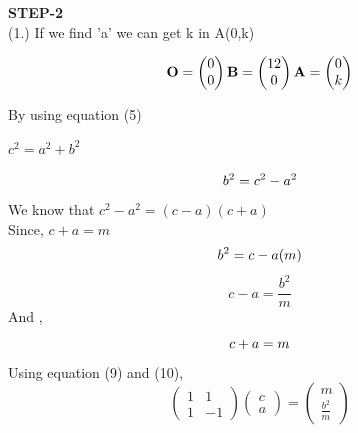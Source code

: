 \documentclass[10pt,a4paper]{report}
\let\vec\mathbf
\begin{document}
\begin{multicols}{2}
\textbf{STEP-2}\vspace{2mm}\\
(1.) If we find 'a' we can get k in A(0,k) \\\vspace{2mm}

\begin{equation}\vec{
    O=\begin{pmatrix}
0\\
0
\end{pmatrix} 
    B=\begin{pmatrix}
12\\
0
\end{pmatrix} 
    A=\begin{pmatrix}
0\\
k
 \end{pmatrix} } \vspace{3mm}
\end{equation}
  
By using equation (5)
\begin{center}
    $ c^2 =a^2 + b^2 $ \vspace{2mm}
\end{center}
\begin{equation}
    b^2 = c^2- a^2 \vspace{2mm}
\end{equation}
We know that $c^2- a^2 =  (c-a) (c+a)$\vspace{2mm}\\
Since, $ c+a=m$
\begin{equation}
  b^2 = c-a (m) \vspace{2mm}
\end{equation}
\begin{equation}
 c-a = \frac{b^2}{m}
\end{equation}
And ,
\begin{equation}
 c+a = m \vspace{2mm}
\end{equation}
Using equation (9) and (10),
\begin{equation}
  \begin{pmatrix}
1 & 1\\
1 &-1
\end{pmatrix} 
\begin{pmatrix}
c\\
a
\end{pmatrix} = \begin{pmatrix}
m\\
\frac{b^2}{m}
\end{pmatrix} 
\end{equation}\vspace{2mm}\\


\end{multicols}
\end{document}
